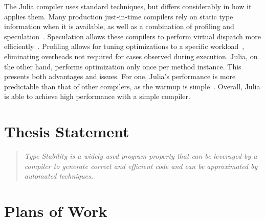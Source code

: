 \documentclass[oneside,openright,titlepage,numbers=noenddot,%
headinclude,footinclude,cleardoublepage=empty,abstract=on,
BCOR=5mm,paper=a4,fontsize=11pt,
dvipsnames
]{scrreprt}
\begin{document}
The Julia compiler uses standard techniques, but differs considerably in how it
applies them. Many production just-in-time compilers rely on static type
information when it is available, as well as a combination of profiling and
speculation~\cite{TruffleIR,TruffleInterpreters}. Speculation allows these
compilers to perform virtual dispatch more efficiently~\cite{oopsla20c}. Profiling allows
for tuning optimizations to a specific workload~\cite{GoWithTheFlow,HHVMJIT},
eliminating overheads not required for cases observed during execution. Julia, on
the other hand, performs optimization only once per method instance.
This presents both advantages
and issues. For one, Julia's performance is more predictable than that of other
compilers, as the warmup is simple~\cite{VMsBlow}. Overall, Julia is able
to achieve high performance with a simple compiler.




\chapter{Thesis Statement}%
\label{chap-th}

\begin{quote}\itshape
Type Stability
is a widely used program property that can be leveraged by a compiler to generate
correct and efficient code
and can be approximated by automated techniques.
\end{quote}





\chapter{Plans of Work}%
\label{chap-proposed}
\end{document}
